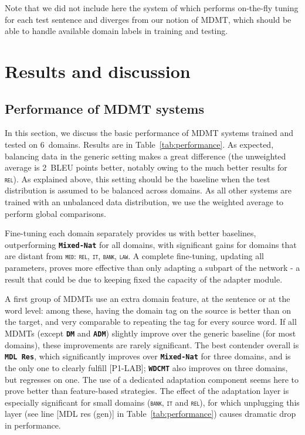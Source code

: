 \documentclass[11pt,a4paper]{article}
\newcommand{\fyDone}[1]{\done[FY]\Todo[FY:]{\textcolor{orange}{#1}}}
\newcommand{\jcTodo}[1]{\Todo[JC:]{\textcolor{red}{#1}}}
\newcommand{\jcDone}[1]{\done[JC]\Todo[JC:]{\textcolor{red}{#1}}}
\newcommand{\domain}[1]{\texttt{\textsc{#1}}}
\newcommand{\system}[1]{\texttt{\textbf{#1}}}
\begin{document}
Note that we did not include here the system of \cite{Farajian17multidomain} which performs on-the-fly tuning for each test sentence and diverges from our notion of MDMT, which should be able to handle available domain labels in training and testing.

\section{Results and discussion \label{sec:results}}

\subsection{Performance of MDMT systems \label{ssec:rawperformance}}
In this section, we discuss the basic performance of MDMT systems trained and tested on $6$~domains. Results are in Table~\ref{tab:performance}. As expected, balancing data in the generic setting makes a great difference (the unweighted average is 2~BLEU points\jcDone{BP?} better, notably owing to the much better results for \domain{rel}). As explained above, this setting should be the baseline when the test distribution is assumed to be balanced across domains. As all other systems are trained with an unbalanced data distribution, we use the weighted average to perform global comparisons.

Fine-tuning each domain separately provides us with better baselines, outperforming \system{Mixed-Nat} for all domains, with significant gains for domains that are distant from \domain{med}: \domain{rel}, \domain{it}, \domain{bank}, \domain{law}. A complete fine-tuning, updating all parameters, proves more effective than only adapting a subpart of the network - a result that could be due to keeping fixed the capacity of the adapter module.\fyDone{Add 2 averages ?}\fyDone{Significance testing wrt Mix Generic, Full Fine-tuned, for each domain}

A  first group of MDMTs use an extra domain feature, at the sentence or at the word level: among these, having the domain tag on the source is better than on the target, and very comparable to repeating the tag for every source word. If all MDMTs (except \system{DM} and \system{ADM}) slightly improve over the generic baseline (for most domains), these improvements are rarely significant. The best contender overall is \system{MDL Res}, which significantly improves over \system{Mixed-Nat} for three domains, and is the only one to clearly fulfill [P1-LAB]; \system{WDCMT} also improves on three domains, but regresses on one. The use of a dedicated adaptation component seems here to prove better than feature-based strategies. The effect of the adaptation layer is especially significant for small domains (\domain{bank}, \domain{it} and \domain{rel}), for which unplugging this layer (see line [MDL res (gen)] in Table~\ref{tab:performance}) causes dramatic drop in performance.\jcTodo{why LDC does not outperform DC as in Minh's paper (for en2fr MED) ?}
\end{document}
